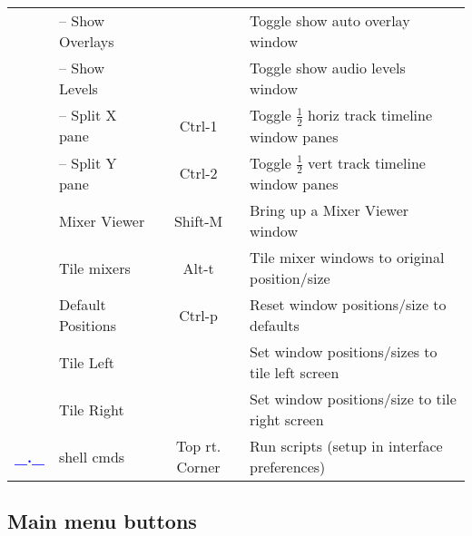 \begin{center}
\begin{longtable}{>{\bfseries}c l c p{6cm}}
             & -- Show Overlays &  & Toggle show auto overlay window \\             
             & -- Show Levels &  & Toggle show audio levels window \\             
             & -- Split X pane & Ctrl-1 & Toggle $\frac{1}{2}$ horiz track timeline window panes \\             
             & -- Split Y pane & Ctrl-2 & Toggle $\frac{1}{2}$ vert track timeline window panes \\             
             & Mixer Viewer & Shift-M & Bring up a Mixer Viewer window \\             
             & Tile mixers & Alt-t & Tile mixer windows to original position/size \\             
             & Default Positions & Ctrl-p & Reset window positions/size to defaults \\             
             & Tile Left &  & Set window positions/sizes to tile left screen \\             
             & Tile Right &  & Set window positions/size to tile right screen \\
             \midrule
           \textcolor{blue}{\_.\_} & shell cmds & Top rt. Corner & Run scripts (setup in interface preferences) \\
                     
             \bottomrule  
    \end{longtable}
\end{center}

\newpage

\subsection{Main menu buttons}%
\label{sub:main_menu_buttons}

